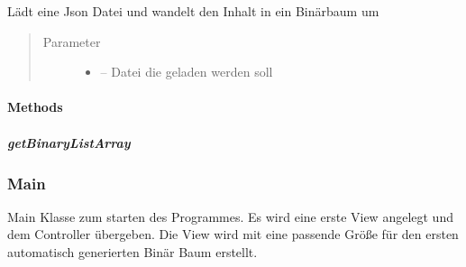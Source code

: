 \documentclass[letterpaper,10pt,ngerman]{sphinxmanual}
\begin{document}
\begin{fulllineitems}
\label{\detokenize{com/linuxluigi/edu/Load:com.linuxluigi.edu.Load.Load(File)}}
Lädt eine Json Datei und wandelt den Inhalt in ein Binärbaum um
\begin{quote}\begin{description}
\item[{Parameter}] \leavevmode\begin{itemize}
\item {} 
 -- Datei die geladen werden soll

\end{itemize}

\end{description}\end{quote}

\end{fulllineitems}



\paragraph{Methods}
\label{\detokenize{com/linuxluigi/edu/Load:methods}}

\subparagraph{getBinaryListArray}
\label{\detokenize{com/linuxluigi/edu/Load:getbinarylistarray}}

\begin{fulllineitems}
\label{\detokenize{com/linuxluigi/edu/Load:com.linuxluigi.edu.Load.getBinaryListArray()}}
\end{fulllineitems}



\subsubsection{Main}
\label{\detokenize{com/linuxluigi/edu/Main::doc}}\label{\detokenize{com/linuxluigi/edu/Main:main}}

\begin{fulllineitems}
\label{\detokenize{com/linuxluigi/edu/Main:com.linuxluigi.edu.Main}}
Main Klasse zum starten des Programmes. Es wird eine erste View angelegt und dem Controller übergeben. Die View wird mit eine passende Größe für den ersten automatisch generierten Binär Baum erstellt.

\end{fulllineitems}
\end{document}

